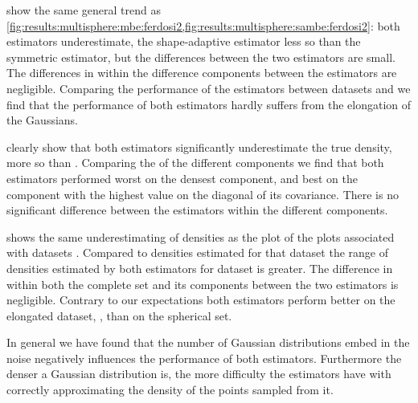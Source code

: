 	 show the same general trend as \cref{fig:results:multisphere:mbe:ferdosi2,fig:results:multisphere:sambe:ferdosi2}: both estimators underestimate, the shape-adaptive estimator less so than the symmetric estimator, but the differences between the two estimators are small. 
	The differences in \MSE within the difference components between the estimators are negligible. 
	Comparing the performance of the estimators between datasets \ferdosiTwo and \baakmanTwo we find that the performance of both estimators hardly suffers from the elongation of the Gaussians. 

	 clearly show that both estimators significantly underestimate the true density, \sambe more so than \mbe. 
	Comparing the \mse of the different components we find that both estimators performed worst on the densest component, and best on the component with the highest value on the diagonal of its covariance. There is no significant difference between the estimators within the different components. 

	 shows the same underestimating of densities as the plot of the plots associated with datasets \ferdosiThree. Compared to densities estimated for that dataset the range of densities estimated by both estimators for dataset \baakmanThree is greater. The difference in \mse within both the complete set and 
	its components between the two estimators is negligible. 
	Contrary to our expectations both estimators perform better on the elongated dataset, \ie \ferdosiThree, than on the spherical set. 

	In general we have found that the number of Gaussian distributions embed in the noise negatively influences the performance of both estimators. Furthermore the denser a Gaussian distribution is, the more difficulty the estimators have with correctly approximating the density of the points sampled from it. 
